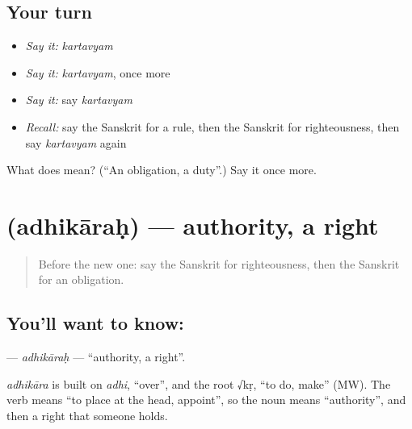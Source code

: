 \subsection*{Your turn}
\begin{itemize}
\raggedright
  \item \emph{Say it:} \emph{kartavyam}
  \item \emph{Say it:} \emph{kartavyam}, once more
  \item \emph{Say it:} say \emph{kartavyam}
  \item \emph{Recall:} say the Sanskrit for a rule, then the Sanskrit for righteousness, then say \emph{kartavyam} again
\end{itemize}

\begin{tcolorbox}[breakable,colback=teal!4,colframe=teal!35!black,title={Before you move on}]
What does  mean? (\textquotedblleft{}An obligation, a duty\textquotedblright{}.) Say it once more.
\end{tcolorbox}
\section[\texorpdfstring{\sk{अधिकारः} (adhikāraḥ)}{अधिकारः (adhikāraḥ)}]{ (adhikāraḥ) — authority, a right}

\label{lesson:SA-C229-adhikarah}



\begin{quote}
Before the new one: say the Sanskrit for righteousness, then the Sanskrit for an obligation.
\end{quote}

\subsection*{You'll want to know: }
\textbf{} — \emph{adhikāraḥ} — \textquotedblleft{}authority, a right\textquotedblright{}.

\begin{cousinweb}
\emph{adhikāra} is built on \emph{adhi}, \textquotedblleft{}over\textquotedblright{}, and the root √kṛ, \textquotedblleft{}to do, make\textquotedblright{} (MW). The verb means \textquotedblleft{}to place at the head, appoint\textquotedblright{}, so the noun means \textquotedblleft{}authority\textquotedblright{}, and then a right that someone holds.
\end{cousinweb}


